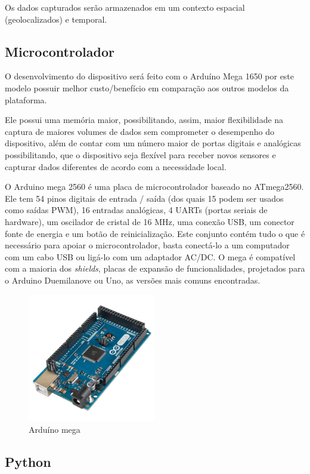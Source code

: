 \documentclass[final,12pt, times, 5p, twocolumn]{elsarticle}
\begin{document}
Os dados capturados serão armazenados em um contexto espacial (geolocalizados) e temporal.

\subsection{Microcontrolador}

O desenvolvimento do dispositivo será feito com o Arduíno Mega 1650 por este modelo possuir melhor custo/benefício em comparação aos outros modelos da plataforma. 

Ele possui uma memória maior, possibilitando, assim, maior flexibilidade na captura de maiores volumes de dados sem comprometer o desempenho do dispositivo, além de contar com um número maior de portas digitais e analógicas possibilitando, que o dispositivo seja flexível para receber novos sensores e capturar dados diferentes de acordo com a necessidade local.

O Arduino mega 2560 é uma placa de microcontrolador baseado no ATmega2560. Ele tem 54 pinos digitais de entrada / saída (dos quais 15 podem ser usados como saídas PWM), 16 entradas analógicas, 4 UARTs (portas seriais de hardware), um oscilador de cristal de 16 MHz, uma conexão USB, um conector fonte de energia e um botão de reinicialização. Este conjunto contém tudo o que é necessário para apoiar o microcontrolador, basta conectá-lo a um computador com um cabo USB ou ligá-lo com um adaptador AC/DC. O mega é compatível com a maioria dos \textit{shields}, placas de expansão de funcionalidades, projetados para o Arduino Duemilanove ou Uno, as versões mais comuns encontradas.

\begin{figure}[ht!]
\centering
\includegraphics[width=0.5\textwidth]{mega.jpg}
\caption{\label{fig:mega}Arduíno mega}
\end{figure}

\subsection{Python}
\end{document}
